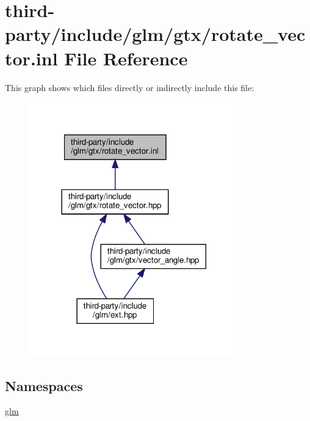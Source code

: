 \hypertarget{rotate__vector_8inl}{}\section{third-\/party/include/glm/gtx/rotate\+\_\+vector.inl File Reference}
\label{rotate__vector_8inl}
This graph shows which files directly or indirectly include this file\+:
\nopagebreak
\begin{figure}[H]
\begin{center}
\leavevmode
\includegraphics[width=257pt]{rotate__vector_8inl__dep__incl}
\end{center}
\end{figure}
\subsection*{Namespaces}
\begin{DoxyCompactItemize}
\item 
 \hyperlink{namespaceglm}{glm}
\end{DoxyCompactItemize}
